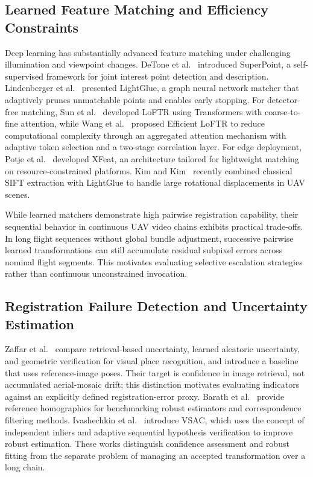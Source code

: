 \subsection{Learned Feature Matching and Efficiency Constraints}
Deep learning has substantially advanced feature matching under challenging illumination and viewpoint changes. DeTone et al.~\cite{detone2018} introduced SuperPoint, a self-supervised framework for joint interest point detection and description. Lindenberger et al.~\cite{lindenberger2023} presented LightGlue, a graph neural network matcher that adaptively prunes unmatchable points and enables early stopping. For detector-free matching, Sun et al.~\cite{sun2021} developed LoFTR using Transformers with coarse-to-fine attention, while Wang et al.~\cite{wang2024} proposed Efficient LoFTR to reduce computational complexity through an aggregated attention mechanism with adaptive token selection and a two-stage correlation layer. For edge deployment, Potje et al.~\cite{xfeat2024} developed XFeat, an architecture tailored for lightweight matching on resource-constrained platforms. Kim and Kim~\cite{kim2025} recently combined classical SIFT extraction with LightGlue to handle large rotational displacements in UAV scenes.

While learned matchers demonstrate high pairwise registration capability, their sequential behavior in continuous UAV video chains exhibits practical trade-offs. In long flight sequences without global bundle adjustment, successive pairwise learned transformations can still accumulate residual subpixel errors across nominal flight segments. This motivates evaluating selective escalation strategies rather than continuous unconstrained invocation.

\subsection{Registration Failure Detection and Uncertainty Estimation}
Zaffar et al.~\cite{zaffar2024} compare retrieval-based uncertainty, learned aleatoric uncertainty, and geometric verification for visual place recognition, and introduce a baseline that uses reference-image poses. Their target is confidence in image retrieval, not accumulated aerial-mosaic drift; this distinction motivates evaluating indicators against an explicitly defined registration-error proxy. Barath et al.~\cite{barath2023} provide reference homographies for benchmarking robust estimators and correspondence filtering methods. Ivashechkin et al.~\cite{ivashechkin2021} introduce VSAC, which uses the concept of independent inliers and adaptive sequential hypothesis verification to improve robust estimation. These works distinguish confidence assessment and robust fitting from the separate problem of managing an accepted transformation over a long chain.

